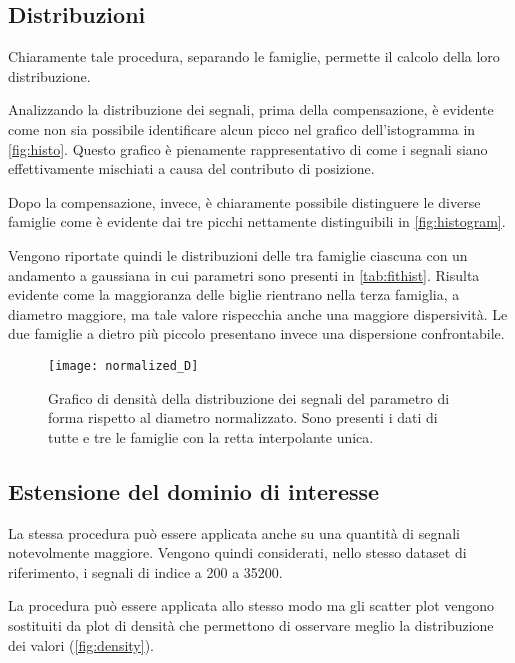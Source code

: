 \subsection{Distribuzioni}

Chiaramente tale procedura, separando le famiglie, permette il calcolo della loro distribuzione.

Analizzando la distribuzione dei segnali, prima della compensazione, è evidente come non sia possibile identificare alcun picco nel grafico dell'istogramma in \cref{fig:histo}. 
Questo grafico è pienamente rappresentativo di come i segnali siano effettivamente mischiati a causa del contributo di posizione.

Dopo la compensazione, invece, è chiaramente possibile distinguere le diverse famiglie come è evidente dai tre picchi nettamente distinguibili in \cref{fig:histogram}.

Vengono riportate quindi le distribuzioni delle tra famiglie ciascuna con un andamento a gaussiana in cui parametri sono presenti in \cref{tab:fithist}. Risulta evidente come la maggioranza delle biglie rientrano nella terza famiglia, a diametro maggiore, ma tale valore rispecchia anche una maggiore dispersività. Le due famiglie a dietro più piccolo presentano invece una dispersione confrontabile.



\begin{figure}[b!]
	\centering
	\texttt{[image: normalized\_D]}
	\caption{Grafico di densità della distribuzione dei segnali del parametro di forma rispetto al diametro normalizzato. Sono presenti i dati di tutte e tre le famiglie con la retta interpolante unica.}
	\label{fig:normalizedDensity}
\end{figure}





\subsection{Estensione del dominio di interesse}




La stessa procedura può essere applicata anche su una quantità di segnali notevolmente maggiore. Vengono quindi considerati, nello stesso dataset di riferimento, i segnali di indice a 200 a 35200. 

La procedura può essere applicata allo stesso modo ma gli scatter plot vengono sostituiti da plot di densità che permettono di osservare meglio la distribuzione dei valori (\cref{fig:density}).

